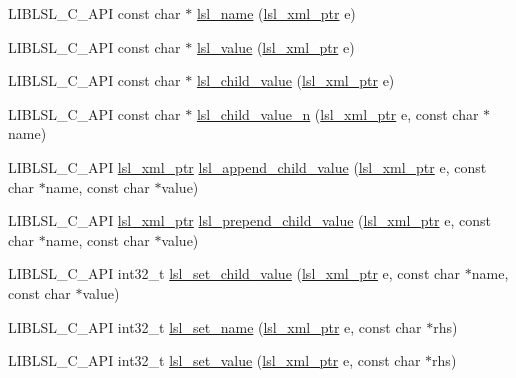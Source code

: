 \begin{DoxyCompactItemize}
L\+I\+B\+L\+S\+L\+\_\+\+C\+\_\+\+A\+PI const char $\ast$ \hyperlink{namespacelsl_a55761eae47f0963850f6077b4c61701e}{lsl\+\_\+name} (\hyperlink{namespacelsl_a5edc7a49a1a1be1634fe6dce3d59c59b}{lsl\+\_\+xml\+\_\+ptr} e)
\item 
L\+I\+B\+L\+S\+L\+\_\+\+C\+\_\+\+A\+PI const char $\ast$ \hyperlink{namespacelsl_a06b7b1f52525d931c57be7eb1216f50a}{lsl\+\_\+value} (\hyperlink{namespacelsl_a5edc7a49a1a1be1634fe6dce3d59c59b}{lsl\+\_\+xml\+\_\+ptr} e)
\item 
L\+I\+B\+L\+S\+L\+\_\+\+C\+\_\+\+A\+PI const char $\ast$ \hyperlink{namespacelsl_aa6a774c3c6e431610a98be1b83bc8a3b}{lsl\+\_\+child\+\_\+value} (\hyperlink{namespacelsl_a5edc7a49a1a1be1634fe6dce3d59c59b}{lsl\+\_\+xml\+\_\+ptr} e)
\item 
L\+I\+B\+L\+S\+L\+\_\+\+C\+\_\+\+A\+PI const char $\ast$ \hyperlink{namespacelsl_ac70e2fc6f64715cead7b4b8e776cc6e7}{lsl\+\_\+child\+\_\+value\+\_\+n} (\hyperlink{namespacelsl_a5edc7a49a1a1be1634fe6dce3d59c59b}{lsl\+\_\+xml\+\_\+ptr} e, const char $\ast$name)
\item 
L\+I\+B\+L\+S\+L\+\_\+\+C\+\_\+\+A\+PI \hyperlink{namespacelsl_a5edc7a49a1a1be1634fe6dce3d59c59b}{lsl\+\_\+xml\+\_\+ptr} \hyperlink{namespacelsl_a3d9fb84fd68c84dd8692e25f1461a894}{lsl\+\_\+append\+\_\+child\+\_\+value} (\hyperlink{namespacelsl_a5edc7a49a1a1be1634fe6dce3d59c59b}{lsl\+\_\+xml\+\_\+ptr} e, const char $\ast$name, const char $\ast$value)
\item 
L\+I\+B\+L\+S\+L\+\_\+\+C\+\_\+\+A\+PI \hyperlink{namespacelsl_a5edc7a49a1a1be1634fe6dce3d59c59b}{lsl\+\_\+xml\+\_\+ptr} \hyperlink{namespacelsl_a40369db591e0a19927d76b6d5c811a94}{lsl\+\_\+prepend\+\_\+child\+\_\+value} (\hyperlink{namespacelsl_a5edc7a49a1a1be1634fe6dce3d59c59b}{lsl\+\_\+xml\+\_\+ptr} e, const char $\ast$name, const char $\ast$value)
\item 
L\+I\+B\+L\+S\+L\+\_\+\+C\+\_\+\+A\+PI int32\+\_\+t \hyperlink{namespacelsl_a637223b4077e6cfa0392d02f9f274ba7}{lsl\+\_\+set\+\_\+child\+\_\+value} (\hyperlink{namespacelsl_a5edc7a49a1a1be1634fe6dce3d59c59b}{lsl\+\_\+xml\+\_\+ptr} e, const char $\ast$name, const char $\ast$value)
\item 
L\+I\+B\+L\+S\+L\+\_\+\+C\+\_\+\+A\+PI int32\+\_\+t \hyperlink{namespacelsl_af13c49d3abab79ae9dd6d94ca7cdc877}{lsl\+\_\+set\+\_\+name} (\hyperlink{namespacelsl_a5edc7a49a1a1be1634fe6dce3d59c59b}{lsl\+\_\+xml\+\_\+ptr} e, const char $\ast$rhs)
\item 
L\+I\+B\+L\+S\+L\+\_\+\+C\+\_\+\+A\+PI int32\+\_\+t \hyperlink{namespacelsl_ab072800f46e425c22568529419a3301b}{lsl\+\_\+set\+\_\+value} (\hyperlink{namespacelsl_a5edc7a49a1a1be1634fe6dce3d59c59b}{lsl\+\_\+xml\+\_\+ptr} e, const char $\ast$rhs)

\end{DoxyCompactItemize}
